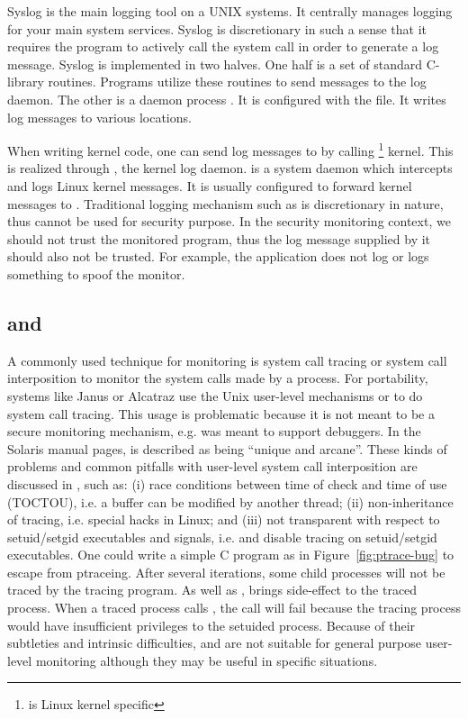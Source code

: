 Syslog is the main logging tool on a UNIX systems. It centrally manages logging
for your main system services. Syslog is discretionary in such a sense that it
requires the program to actively call the  system call in order to
generate a log message. Syslog is implemented in two halves. One half is a set
of standard C-library routines. Programs utilize these routines to send
messages to the log daemon. The other is a daemon process . It is
configured with the  file. It writes log messages to various
locations.

When writing kernel code, one can send log messages to  by calling
\footnote{ is Linux kernel specific} kernel.  This is
realized through , the kernel log daemon.   is a system
daemon which intercepts and logs Linux kernel messages. It is usually
configured to forward kernel messages to . Traditional logging
mechanism such as  is discretionary in nature, thus cannot be used
for security purpose. In the security monitoring context, we should not trust
the monitored program, thus the log message supplied by it should also not be
trusted. For example, the application does not log or logs something to spoof
the monitor.

\subsection{ and }
\label{sec:ptrace}

A commonly used technique for monitoring is system call tracing or system call
interposition to monitor the system calls made by a process.
For portability, systems like Janus \cite{wagner1999janus} or Alcatraz \cite{liang2009alcatraz}
use the Unix user-level mechanisms  or  to do
system call tracing.
This usage is problematic because it is not
meant to be a secure monitoring mechanism, e.g.
 was meant to support debuggers.
In the Solaris manual pages,  is described as being
``unique and arcane''.
These kinds of problems and common
pitfalls with user-level system call interposition
are discussed in \cite{garfinkel2003traps}, such as:
(i) race conditions between time of check and time of use (TOCTOU), 
i.e. a buffer can be modified by another thread;
(ii) non-inheritance of tracing, i.e. special  hacks in Linux;
and (iii) not transparent with respect to setuid/setgid executables 
and signals,
i.e.  and  disable tracing 
on setuid/setgid executables.  
One could write a simple C program as in Figure~\ref{fig:ptrace-bug}
to escape from ptraceing.
After several iterations, some
child processes will not be traced by the tracing program.
As well as , 
brings side-effect to the traced process.
When a traced process calls ,
the call will fail because the tracing process would have insufficient
privileges to the setuided process.
Because of their subtleties and intrinsic difficulties,
 and  are not suitable for general purpose user-level
monitoring although they may be useful in specific situations.

